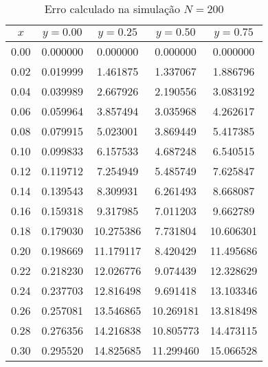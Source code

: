 \documentclass[column,amsmath,amssymb,floatfix]{revtex4}
\begin{document}
\begin{enumerate}
\begin{enumerate}
    
                \begin{table}[H]
                    \centering
                    \caption{Erro calculado na simulação $N=200$}
                    \label{tab:erro_xy_200}
                    \renewcommand{\arraystretch}{1.25}
                    \setlength{\tabcolsep}{12pt}
                    \begin{tabular}{|c|c|c|c|c|}
                        \hline
                        \textbf{$x$} & \textbf{$y = 0.00$} & \textbf{$y = 0.25$} & \textbf{$y = 0.50$} & \textbf{$y = 0.75$} \\ \hline
                        0.00 & 0.000000 & 0.000000 & 0.000000 & 0.000000 \\ \hline
                        0.02 & 0.019999 & 1.461875 & 1.337067 & 1.886796 \\ \hline
                        0.04 & 0.039989 & 2.667926 & 2.190556 & 3.083192 \\ \hline
                        0.06 & 0.059964 & 3.857494 & 3.035968 & 4.262617 \\ \hline
                        0.08 & 0.079915 & 5.023001 & 3.869449 & 5.417385 \\ \hline
                        0.10 & 0.099833 & 6.157533 & 4.687248 & 6.540515 \\ \hline
                        0.12 & 0.119712 & 7.254949 & 5.485749 & 7.625847 \\ \hline
                        0.14 & 0.139543 & 8.309931 & 6.261493 & 8.668087 \\ \hline
                        0.16 & 0.159318 & 9.317985 & 7.011203 & 9.662789 \\ \hline
                        0.18 & 0.179030 & 10.275386 & 7.731804 & 10.606301 \\ \hline
                        0.20 & 0.198669 & 11.179117 & 8.420429 & 11.495686 \\ \hline
                        0.22 & 0.218230 & 12.026776 & 9.074439 & 12.328629 \\ \hline
                        0.24 & 0.237703 & 12.816498 & 9.691418 & 13.103346 \\ \hline
                        0.26 & 0.257081 & 13.546865 & 10.269181 & 13.818498 \\ \hline
                        0.28 & 0.276356 & 14.216838 & 10.805773 & 14.473115 \\ \hline
                        0.30 & 0.295520 & 14.825685 & 11.299460 & 15.066528 \\ \hline

\end{tabular}
\end{table}
\end{enumerate}
\end{enumerate}
\end{document}
